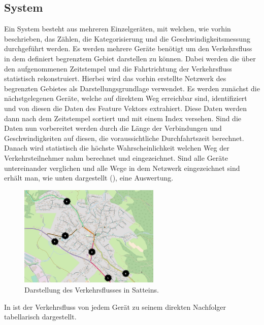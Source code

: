 \subsection{System}
Ein System besteht aus mehreren Einzelgeräten, mit welchen, wie vorhin beschrieben, das Zählen, die Kategorisierung und die Geschwindigkeitsmessung durchgeführt werden. Es werden mehrere Geräte benötigt um den Verkehrsfluss in dem definiert begrenztem Gebiet darstellen zu können. Dabei werden die über den aufgenommenen Zeitstempel und die Fahrtrichtung der Verkehrsfluss statistisch rekonstruiert. Hierbei wird das vorhin erstellte Netzwerk des begrenzten Gebietes als Darstellungsgrundlage verwendet. Es werden zunächst die nächstgelegenen Geräte, welche auf direktem Weg erreichbar sind, identifiziert und von diesen die Daten des Feature Vektors extrahiert. Diese Daten werden dann nach dem Zeitstempel sortiert und mit einem Index versehen. Sind die Daten nun vorbereitet werden durch die Länge der Verbindungen und Geschwindigkeiten auf diesen, die voraussichtliche Durchfahrtszeit berechnet. Danach wird statistisch die höchste Wahrscheinlichkeit welchen Weg der Verkehrsteilnehmer nahm berechnet und eingezeichnet. Sind alle Geräte untereinander verglichen und alle Wege in dem Netzwerk eingezeichnet sind erhält man, wie unten dargestellt (), eine Auswertung. 

\begin{figure}[H]
  \centering
  \includegraphics[width=0.6\textwidth]{Resultate/Auswertung.jpg} 
  \caption{Darstellung des Verkehrsflusses in Satteins.}
  \label{bAuswertung}
\end{figure}
In  ist der Verkehrsfluss von jedem Gerät zu seinem direkten Nachfolger tabellarisch dargestellt. 

\setlength\tabcolsep{5pt}

